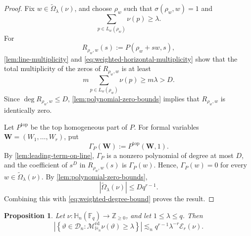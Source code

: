 \documentclass[11pt,letterpaper]{amsart}
\numberwithin{equation}{section}
\newtheorem{proposition}[proposition]{Proposition}
\theoremstyle{definition}
\theoremstyle{remark}
\newcommand{\Fq}{\mathbb F_q}
\newcommand{\HH}{\mathbb H}
\newcommand{\Dn}{\mathcal D_n}
\newcommand{\Mrd}{\mathcal M^{\mathrm{rd}}_{\HH_n}}
\begin{document}
\begin{proof}
Fix $w\in \widetilde\Omega_\lambda(\nu)$, and choose $\rho_w$ such that
$\sigma(\rho_w,w)=1$ and
\[
 \sum_{p\in L_w(\rho_w)}\nu(p)\geq\lambda.
\]
For
\[
 R_{\rho_w,w}(s):=P(\rho_w+sw,s),
\]
\cref{lem:line-multiplicity} and
\eqref{eq:weighted-horizontal-multiplicity} show that the total
multiplicity of the zeros of $R_{\rho_w,w}$ is at least
\[
 m\sum_{p\in L_w(\rho_w)}\nu(p)
 \geq m\lambda>D.
\]
Since $\deg R_{\rho_w,w}\leq D$,
\cref{lem:polynomial-zero-bounds} implies that $R_{\rho_w,w}$ is identically zero.

Let $P^{\mathrm{top}}$ be the top homogeneous part of $P$.  For formal variables $\mathbf W=(W_1,\ldots,W_r)$, put
\[
 \Gamma_P(\mathbf W):=P^{\mathrm{top}}(\mathbf W,1).
\]
By \cref{lem:leading-term-on-line}, $\Gamma_P$ is a nonzero polynomial of degree at most $D$, and the coefficient of $s^D$ in $R_{\rho_w,w}(s)$ is $\Gamma_P(w)$. Hence, $\Gamma_P(w)=0$ for every
$w\in \widetilde\Omega_\lambda(\nu)$. By \cref{lem:polynomial-zero-bounds},
\[
 |\widetilde\Omega_\lambda(\nu)|\leq Dq^{r-1}.
\]
Combining this with \eqref{eq:weighted-degree-bound} proves the result.
\end{proof}

\begin{proposition}
\label{prop:integer-weighted-level}
Let $\nu:\HH_n(\Fq)\to\mathbb Z_{\geq0}$, and let
$1\leq\lambda\leq q$.  Then
\begin{equation}\label{eq:integer-weighted-level}
 \left|
 \left\{\vartheta\in\Dn:\Mrd \nu(\vartheta)\geq\lambda\right\}
 \right|
 \lesssim_n
 q^{r-1}\lambda^{-r}\mathcal E_r(\nu).
\end{equation}
\end{proposition}
\end{document}
